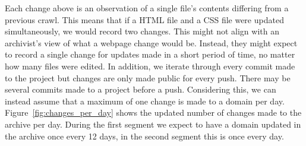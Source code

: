 \documentclass[11pt]{article}
\begin{document}
Each change above is an observation of a single file's contents differing from a previous crawl. This means that if a HTML file and a CSS file were updated simultaneously, we would record two changes. This might not align with an archivist's view of what a webpage change would be. Instead, they might expect to record a single change for updates made in a short period of time, no matter how many files were edited. In addition, we iterate through every commit made to the project but changes are only made public for every push. There may be several commits made to a project before a push. Considering this, we can instead assume that a maximum of one change is made to a domain per day. Figure~\ref{fig:changes_per_day} shows the updated number of changes made to the archive per day. During the first segment we expect to have a domain updated in the archive once every 12 days, in the second segment this is once every day.

\end{document}
